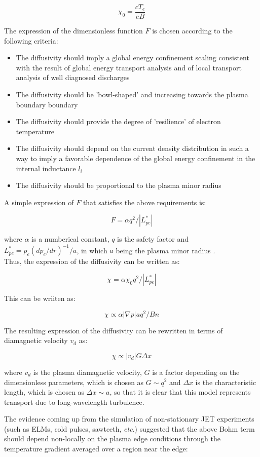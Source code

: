 \documentclass{article}    %
\begin{document}
\[ \chi_{0} = \frac{cT_e}{eB}\]

The expression of the dimensionless function $F$ is chosen according to the following criteria:\

\begin{itemize}
\item The diffusivity should imply a global energy confinement scaling consistent with the result of global energy transport analysis and of local transport analysis of well diagnosed discharges 
\item The diffusivity should be 'bowl-shaped' and increasing towards the plasma boundary boundary
\item The diffusivity should provide the degree of 'resilience' of electron temperature
\item The diffusivity should depend on the current density distribution in such a way to imply a favorable dependence of the global energy confinement in the internal inductance $l_i$
\item The diffusivity should be proportional to the plasma minor radius
\end{itemize}

A simple expression of $F$ that satisfies the above requirements is:\hfill

\[ F = \alpha q^2/|L_{pe}^*|\]

where $\alpha$ is a numberical constant, $q$ is the safety factor and $L_{pe}^*=p_{e}(dp_{e}/dr)^{-1}/a$, in which 
$a$ being the plasma minor radius \cite{erba95}.  \\

Thus, the expression of the diffusivity can be written as:\hfill

\[\chi = \alpha \chi_{0} q^2/|L_{pe}^*| \]

This can be wriiten as:\hfill

\[\chi \propto \alpha |\nabla p| a q^2 / B n \]

The resulting expression of the diffusivity can be rewritten in terms of diamagnetic velocity $v_d$ as:\hfill

\[ \chi \propto |v_{d}| G \Delta x \]

where $v_{d}$ is the plasma diamagnetic velocity, $G$ is a factor depending on the dimensionless parameters, which is chosen as $G \sim q^2$ and $\Delta x$ is the characteristic length, which is chosen as $\Delta x \sim a$,
so that it is clear that this model represents transport due to 
long-wavelength turbulence.

The evidence coming up from the simulation of non-stationary
JET experiments \cite{erb97} (such as ELMs, cold pulses, sawteeth, {\sl etc}.)
suggested that the above Bohm term should depend non-locally
on the plasma edge conditions through the temperature
gradient averaged over a region near the edge:\hfill
\end{document}
